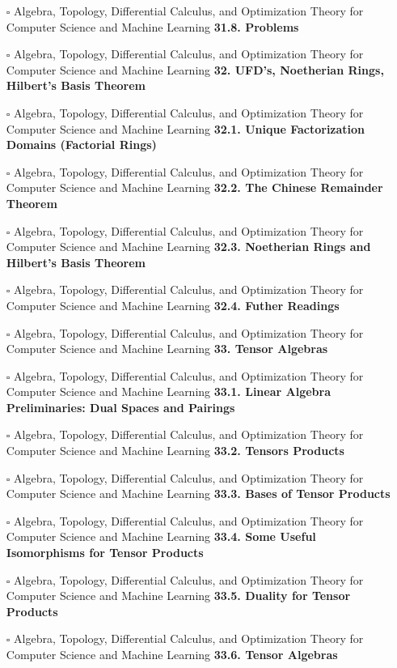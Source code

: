 \documentclass[a4, landscape, 12pt]{article}
\newcommand{\checkbox}{$\square$}%
\begin{document}
\begin{itemize}
{}
\item [\checkbox]  Algebra, Topology, Differential Calculus, and Optimization Theory for Computer Science and Machine Learning \textbf{ 31.8. Problems
}
\item [\checkbox]  Algebra, Topology, Differential Calculus, and Optimization Theory for Computer Science and Machine Learning \textbf{ 32. UFD’s, Noetherian Rings, Hilbert’s Basis Theorem
}
\item [\checkbox]  Algebra, Topology, Differential Calculus, and Optimization Theory for Computer Science and Machine Learning \textbf{ 32.1. Unique Factorization Domains (Factorial Rings)
}
\item [\checkbox]  Algebra, Topology, Differential Calculus, and Optimization Theory for Computer Science and Machine Learning \textbf{ 32.2. The Chinese Remainder Theorem
}
\item [\checkbox]  Algebra, Topology, Differential Calculus, and Optimization Theory for Computer Science and Machine Learning \textbf{ 32.3. Noetherian Rings and Hilbert’s Basis Theorem
}
\item [\checkbox]  Algebra, Topology, Differential Calculus, and Optimization Theory for Computer Science and Machine Learning \textbf{ 32.4. Futher Readings
}
\item [\checkbox]  Algebra, Topology, Differential Calculus, and Optimization Theory for Computer Science and Machine Learning \textbf{ 33. Tensor Algebras
}
\item [\checkbox]  Algebra, Topology, Differential Calculus, and Optimization Theory for Computer Science and Machine Learning \textbf{ 33.1. Linear Algebra Preliminaries: Dual Spaces and Pairings
}
\item [\checkbox]  Algebra, Topology, Differential Calculus, and Optimization Theory for Computer Science and Machine Learning \textbf{ 33.2. Tensors Products
}
\item [\checkbox]  Algebra, Topology, Differential Calculus, and Optimization Theory for Computer Science and Machine Learning \textbf{ 33.3. Bases of Tensor Products
}
\item [\checkbox]  Algebra, Topology, Differential Calculus, and Optimization Theory for Computer Science and Machine Learning \textbf{ 33.4. Some Useful Isomorphisms for Tensor Products
}
\item [\checkbox]  Algebra, Topology, Differential Calculus, and Optimization Theory for Computer Science and Machine Learning \textbf{ 33.5. Duality for Tensor Products
}
\item [\checkbox]  Algebra, Topology, Differential Calculus, and Optimization Theory for Computer Science and Machine Learning \textbf{ 33.6. Tensor Algebras
}
\end{itemize}
\end{document}
